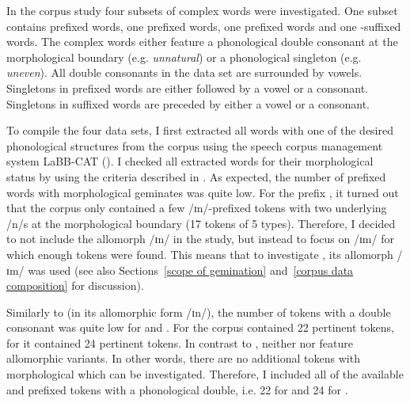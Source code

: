 In the corpus study four subsets of complex words were investigated. One subset contains prefixed words, one prefixed words,
 one prefixed words and one -suffixed words. The complex words either feature a phonological double consonant at the morphological boundary (e.g. \textit{unnatural}) or a phonological singleton (e.g. \textit{uneven}).
All double consonants in the data set are surrounded by vowels. Singletons in prefixed words are either followed by a vowel or a consonant. Singletons in suffixed words are preceded by either a vowel or a consonant.

To compile the four data sets, I first extracted all words with one of the desired phonological structures from the corpus using the speech corpus management system LaBB-CAT (\citealt{Fromont.2012,Fromont.20032015}).  
I checked all extracted words for their morphological status by using the criteria described in .
As expected, the number of prefixed words with morphological {geminates} was quite low. 
For the prefix ,
it turned out that the corpus only contained a few /ɪn/-prefixed tokens with two underlying /n/s at the morphological boundary (17 tokens of 5 types). Therefore, I decided to not include the allomorph /ɪn/ in the study, but instead to focus on /ɪm/ for which enough tokens were found. This means that to investigate , its allomorph /ɪm/ was used (see also Sections~\ref{scope of gemination} and~\ref{corpus data composition} for discussion).

Similarly to  (in its allomorphic form /ɪn/), the number of tokens with a double consonant was quite low for  and . For  the corpus contained 22 pertinent tokens, for  it contained 24 pertinent tokens. In contrast to , neither  nor  feature allomorphic variants. In other words, there are no additional tokens with morphological  which can be investigated. Therefore, I included all of the available  and prefixed tokens with a phonological double, i.e. 22 for  and 24 for . 

